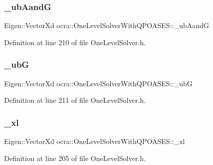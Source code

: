 \subsubsection{\texorpdfstring{\+\_\+ub\+AandG}{\_ubAandG}}
{\footnotesize\ttfamily Eigen\+::\+Vector\+Xd ocra\+::\+One\+Level\+Solver\+With\+Q\+P\+O\+A\+S\+E\+S\+::\+\_\+ub\+AandG\hspace{0.3cm}{\ttfamily [protected]}}



Definition at line 210 of file One\+Level\+Solver.\+h.

\hypertarget{classocra_1_1OneLevelSolverWithQPOASES_ac3b8f982ead7c50e7396d99e63f02ac3}{}\label{classocra_1_1OneLevelSolverWithQPOASES_ac3b8f982ead7c50e7396d99e63f02ac3} 
\subsubsection{\texorpdfstring{\+\_\+ubG}{\_ubG}}
{\footnotesize\ttfamily Eigen\+::\+Vector\+Xd ocra\+::\+One\+Level\+Solver\+With\+Q\+P\+O\+A\+S\+E\+S\+::\+\_\+ubG\hspace{0.3cm}{\ttfamily [protected]}}



Definition at line 211 of file One\+Level\+Solver.\+h.

\hypertarget{classocra_1_1OneLevelSolverWithQPOASES_a67a41fa1b101ce2885012b796c8bfe47}{}\label{classocra_1_1OneLevelSolverWithQPOASES_a67a41fa1b101ce2885012b796c8bfe47} 
\subsubsection{\texorpdfstring{\+\_\+xl}{\_xl}}
{\footnotesize\ttfamily Eigen\+::\+Vector\+Xd ocra\+::\+One\+Level\+Solver\+With\+Q\+P\+O\+A\+S\+E\+S\+::\+\_\+xl\hspace{0.3cm}{\ttfamily [protected]}}



Definition at line 205 of file One\+Level\+Solver.\+h.

